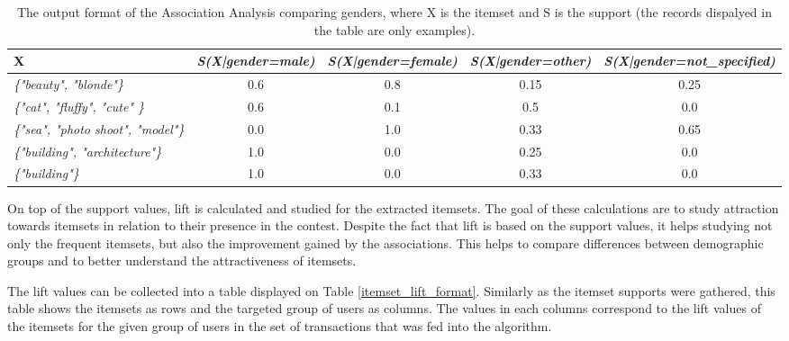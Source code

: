     \begin{table}[H]
        \centering
        \begin{adjustbox}{width=1\textwidth}
            \begin{tabular}{l|c|c|c|c}
                X & \emph{S(X|gender=male)} & \emph{S(X|gender=female)} & \emph{S(X|gender=other)} & \emph{S(X|gender=not\_specified)} \\
                \hline
                \emph{\{"beauty", "blonde"\}} & 0.6 & 0.8 & 0.15 & 0.25 \\
                \emph{\{"cat", "fluffy", "cute" \}} & 0.6 & 0.1 & 0.5 & 0.0 \\
                \emph{\{"sea", "photo shoot", "model"\}} & 0.0 & 1.0 & 0.33 & 0.65 \\
                \emph{\{"building", "architecture"\}} & 1.0 & 0.0 & 0.25 & 0.0 \\
                \emph{\{"building"\}} & 1.0 & 0.0 & 0.33 & 0.0
            \end{tabular}
        \end{adjustbox}
        \caption{The output format of the Association Analysis comparing genders, where X is the itemset and S is the support (the records dispalyed in the table are only examples).}
        \label{itemset_supports_format}
    \end{table}

    On top of the support values, lift is calculated and studied for the extracted itemsets. The goal of these calculations are to study attraction towards itemsets in relation to their presence in the contest. Despite the fact that lift is based on the support values, it helps studying not only the frequent itemsets, but also the improvement gained by the associations. This helps to compare differences between demographic groups and to better understand the attractiveness of itemsets.

    The lift values can be collected into a table displayed on Table \ref{itemset_lift_format}. Similarly as the itemset supports were gathered, this table shows the itemsets as rows and the targeted group of users as columns. The values in each columns correspond to the lift values of the itemsets for the given group of users in the set of transactions that was fed into the algorithm. 

